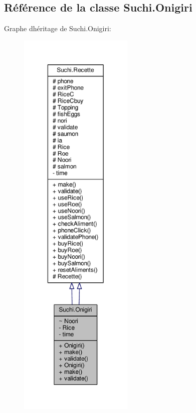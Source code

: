 \hypertarget{classSuchi_1_1Onigiri}{}\subsection{Référence de la classe Suchi.\+Onigiri}
\label{classSuchi_1_1Onigiri}


Graphe d\textquotesingle{}héritage de Suchi.\+Onigiri\+:\nopagebreak
\begin{figure}[H]
\begin{center}
\leavevmode
\includegraphics[height=550pt]{classSuchi_1_1Onigiri__inherit__graph}
\end{center}
\end{figure}


